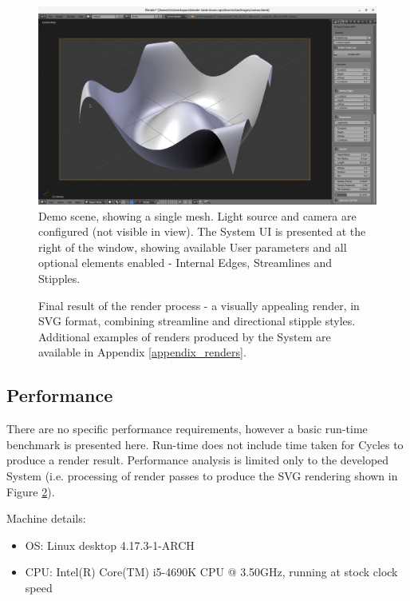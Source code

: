 {\begin{figure}[h!]
	\centering
	\includegraphics[width=\textwidth]{images/demo_blender.png}
	\caption{Demo scene, showing a single mesh. Light source and camera are configured (not visible in view). The System UI is presented at the right of the window, showing available User parameters and all optional elements enabled - Internal Edges, Streamlines and Stipples.}\label{demo_blender}
\end{figure}

\begin{figure}[h!]
	\centering
	
	\caption{Final result of the render process - a visually appealing render, in SVG format, combining streamline and directional stipple styles. Additional examples of renders produced by the System are available in Appendix \ref{appendix_renders}.}\label{demo_result}
\end{figure}

\FloatBarrier
\subsection{Performance}\label{performance}

There are no specific performance requirements, however a basic run-time benchmark is presented here.
Run-time does not include time taken for Cycles to produce a render result. 
Performance analysis is limited only to the developed System (i.e. processing of render passes to produce the SVG rendering shown in Figure \ref{demo_result}).

Machine details:
\begin{itemize}
	\item{OS: Linux desktop 4.17.3-1-ARCH}
	\item{CPU: Intel(R) Core(TM) i5-4690K CPU @ 3.50GHz, running at stock clock speed}
\end{itemize}

}
